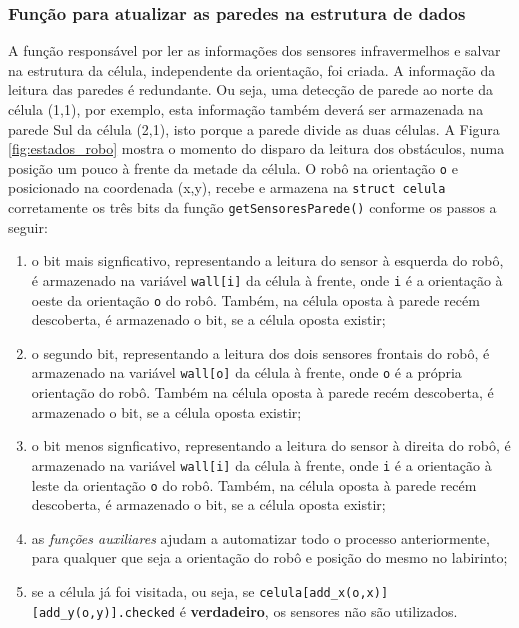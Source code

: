 \subsubsection{Função para atualizar as paredes na estrutura de dados}
A função responsável por ler as informações dos sensores infravermelhos e salvar na estrutura da célula, independente da orientação, foi criada. A informação da leitura das paredes é redundante. Ou seja, uma detecção de parede ao norte da célula (1,1), por exemplo, esta informação também deverá ser armazenada na parede Sul da célula (2,1), isto porque a parede divide as duas células. A Figura \ref{fig:estados_robo} mostra o momento do disparo da leitura dos obstáculos, numa posição um pouco à frente da metade da célula. O robô na orientação \texttt{o} e posicionado na coordenada (x,y), recebe e armazena na \verb+struct celula+ corretamente os três bits da função \verb+getSensoresParede()+ conforme os passos a seguir:

\begin{enumerate}[leftmargin=2cm,label=\alph*)]
	\item o bit mais signficativo, representando a leitura do sensor à esquerda do robô, é armazenado na variável \texttt{wall[i]} da célula à frente, onde \texttt{i} é a orientação à oeste da orientação \texttt{o} do robô. Também, na célula oposta à parede recém descoberta, é armazenado o bit, se a célula oposta existir;
	
	\item o segundo bit, representando a leitura dos dois sensores frontais do robô, é armazenado na variável \texttt{wall[o]} da célula à frente, onde \texttt{o} é a própria orientação do robô. Também na célula oposta à parede recém descoberta, é armazenado o bit, se a célula oposta existir;
	
	\item o bit menos signficativo, representando a leitura do sensor à direita do robô, é armazenado na variável \texttt{wall[i]} da célula à frente, onde \texttt{i} é a orientação à leste da orientação \texttt{o} do robô. Também, na célula oposta à parede recém descoberta, é armazenado o bit, se a célula oposta existir;
	
	\item as \emph{funções auxiliares} ajudam a automatizar todo o processo anteriormente, para qualquer que seja a orientação do robô e posição do mesmo no labirinto;
	
	\item se a célula já foi visitada, ou seja, se \verb+celula[add_x(o,x)][add_y(o,y)].checked+ é \textbf{verdadeiro}, os sensores não são utilizados.
\end{enumerate}


